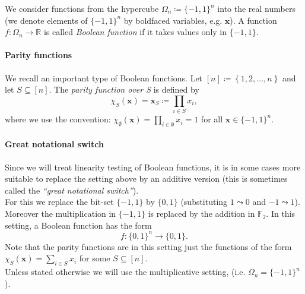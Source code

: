 \documentclass[a4paper]{article}
\newcommand{\real}{\mathbb{R}}
\newcommand{\nset}{[n]}
\newcommand{\boldx}{\boldsymbol{x}}
\theoremstyle{plain}
\theoremstyle{definition}
\theoremstyle{remark}
\begin{document}
\noindent We consider functions from the hypercube \(\Omega_n \coloneqq
\{-1,1\}^n\) into the real numbers (we denote elements of \(\{-1,1\}^n
\) by boldfaced variables, e.g. \(\boldx\)). A function \(f: \Omega_n
\rightarrow \real\) is called \emph{Boolean function} if it takes values only in
\(\{-1,1\}\). 

\paragraph{Parity functions}
\label{sec:parity-functions}

We recall an important type of Boolean functions. Let \(\nset
\coloneqq \left\{1,2, \dots, n\right\}\) and let \(S\subseteq
\nset\). The \emph{parity function over S} is defined by 
\[ \chi_S(\boldx) =  \boldx_S \coloneqq \prod_{i \in S} x_i, \]
where we use the convention: \(\chi_\emptyset(\boldx) = \prod_{i  \in
  \emptyset} x_i = 1\) for all \(\boldx \in \{-1,1\}^n\). 


\paragraph{Great notational switch}
\label{sec:great-notat-switch}

Since we will treat linearity testing of Boolean functions, it is in
some cases more suitable to replace the setting above by an
additive version (this is sometimes called the \emph{``great
  notational switch''}).\\
For this we replace the bit-set \(\{-1,1\}\) by \(\{0,1\}\)
(substituting \(1 \leadsto 0 \) and \(-1 \leadsto 1\)).  
Moreover the multiplication in \(\{-1,1\}\) is replaced by the
addition in \(\mathbb{F}_2\). 
In this setting, a Boolean function has the form 
\[f: \{0,1\}^n \rightarrow \{0,1\}.\]
Note that the parity functions are in this setting just the functions of
the form \(\chi_S(\boldx) = \sum_{i\in S} x_i\) for some \(S\subseteq
\nset\). \\

\noindent Unless stated otherwise we will use the multiplicative setting, (i.e.
\(\Omega_n = \{-1,1\}^n\)). 
\end{document}
